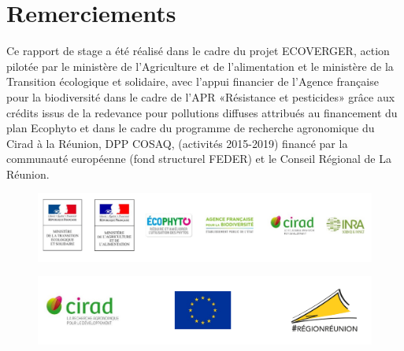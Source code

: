 \section*{Remerciements}

Ce rapport de stage a été réalisé dans le cadre du projet ECOVERGER, action pilotée par le ministère de l’Agriculture et de l’alimentation et le ministère de la Transition écologique et solidaire, avec l’appui financier de l’Agence française pour la biodiversité dans le cadre de l'APR «Résistance et pesticides» grâce aux crédits issus de la redevance pour pollutions diffuses attribués au financement du plan Ecophyto et dans le cadre du programme de recherche agronomique du Cirad à la Réunion, DPP COSAQ, (activités 2015-2019) financé par la communauté européenne (fond structurel FEDER) et le Conseil Régional de La Réunion.





\begin{figure}[!h]
 \centering
 \includegraphics[scale = 0.3]{photos/ecoverger.png}
\end{figure}



\begin{figure}[!h]
 \centering
 \includegraphics[scale = 0.3]{photos/cosaq.png}
\end{figure}

